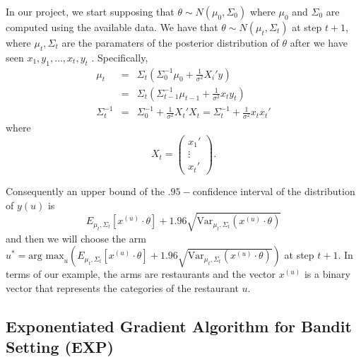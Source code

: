\documentclass{article}
\theoremstyle{plain}
\theoremstyle{definition}
\begin{document}
In our project, we start supposing that $\theta\sim N\left(\mu_{0},\Sigma_{0}\right)$
where $\mu_{0}$ and $\Sigma_{0}$ are computed using the available
data. We have that $\theta\sim N\left(\mu_{t},\Sigma_{t}\right)$
at step $t+1$, where $\mu_{t},\Sigma_{t}$ are the paramaters of
the posterior distribution of $\theta$ after we have seen $x_{1},y_{1},\ldots,x_{t},y_{t}$
. Specifically,
\begin{eqnarray*}
\mu_{t} & = & \Sigma_{t}\left(\Sigma_{0}^{-1}\mu_{0}+\frac{1}{\sigma^{2}}X_{i}'y\right)\\
 & = & \Sigma_{t}\left(\Sigma_{t-1}^{-1}\mu_{t-1}+\frac{1}{\sigma^{2}}x_{t}y_{t}\right)\\
\Sigma_{t}^{-1} & = & \Sigma_{0}^{-1}+\frac{1}{\sigma^{2}}X_{t}'X_{t}=\Sigma_{t}^{-1}+\frac{1}{\sigma^{2}}x_{t}x_{t}'
\end{eqnarray*}
where 
\[
X_{t}=\left(\begin{array}{c}
x_{1}'\\
\vdots\\
x_{t}'
\end{array}\right).
\]


Consequently an upper bound of the $.95-$confidence interval of the distribution
of $y\left(u\right)$ is 
\[
E_{\mu_{t},\Sigma_{t}}\left[x^{\left(u\right)}\cdot\theta\right]+1.96\sqrt{\mbox{Var}_{\mu_{t},\Sigma_{t}}\left(x^{\left(u\right)}\cdot\theta\right)}
\]
and then we will choose the arm $u^{*}=\mbox{arg max}_{u}\left(E_{\mu_{t},\Sigma_{t}}\left[x^{\left(u\right)}\cdot\theta\right]+1.96\sqrt{\mbox{Var}_{\mu_{t},\Sigma_{t}}\left(x^{\left(u\right)}\cdot\theta\right)}\right)$
at step $t+1$. In terms of our example, the arms are restaurants
and the vector $x^{\left(u\right)}$ is a binary vector that represents
the categories of the restaurant $u$.

\subsection{Exponentiated Gradient Algorithm for Bandit Setting (EXP)}
\end{document}
